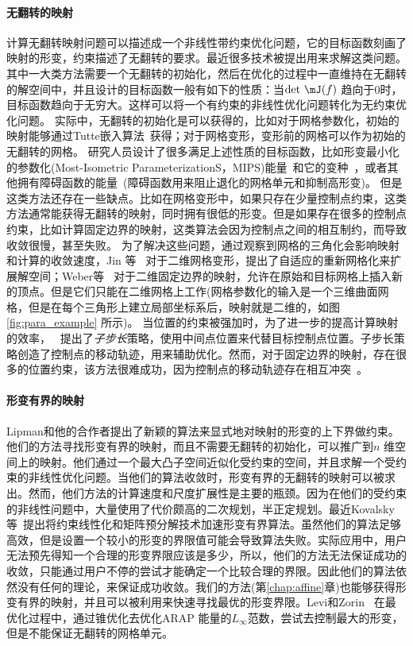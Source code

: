 \paragraph{无翻转的映射} 计算无翻转映射问题可以描述成一个非线性带约束优化问题，它的目标函数刻画了映射的形变，约束描述了无翻转的要求。最近很多技术被提出用来求解这类问题。其中一大类方法需要一个无翻转的初始化，然后在优化的过程中一直维持在无翻转的解空间中，并且设计的目标函数一般有如下的性质：当$\det\, \mJ(f)$ 趋向于0时，目标函数趋向于无穷大。这样可以将一个有约束的非线性优化问题转化为无约束优化问题。
实际中，无翻转的初始化是可以获得的，比如对于网格参数化，初始的映射能够通过Tutte嵌入算法~\cite{Tutte1963,Floater2003}获得；对于网格变形，变形前的网格可以作为初始的无翻转的网格。
研究人员设计了很多满足上述性质的目标函数，比如形变最小化的参数化(Most-Isometric ParameterizationS，MIPS)能量~\cite{Hormann2000}和它的变种~\cite{Degener2003,Fu2015,Smith2015}，或者其他拥有障碍函数的能量~\cite{Schuller2013,Jin2014}(障碍函数用来阻止退化的网格单元和抑制高形变)。
但是这类方法还存在一些缺点。比如在网格变形中，如果只存在少量控制点约束，这类方法通常能获得无翻转的映射，同时拥有很低的形变。但是如果存在很多的控制点约束，比如计算固定边界的映射，这类算法会因为控制点之间的相互制约，而导致收敛很慢，甚至失败。 为了解决这些问题，通过观察到网格的三角化会影响映射和计算的收敛速度，Jin 等~\cite{Jin2014} 对于二维网格变形，提出了自适应的重新网格化来扩展解空间；Weber等~\cite{Weber2014} 对于二维固定边界的映射，允许在原始和目标网格上插入新的顶点。但是它们只能在二维网格上工作(网格参数化的输入是一个三维曲面网格，但是在每个三角形上建立局部坐标系后，映射就是二维的，如图\ref{fig:para_example} 所示)。 当位置的约束被强加时，为了进一步的提高计算映射的效率，~\cite{Schuller2013} 提出了\emph{子步长}策略，使用中间点位置来代替目标控制点位置。子步长策略创造了控制点的移动轨迹，用来辅助优化。然而，对于固定边界的映射，存在很多的位置约束，该方法很难成功，因为控制点的移动轨迹存在相互冲突~\cite{Jin2014,Fu2015}。

\paragraph{形变有界的映射} Lipman和他的合作者提出了新颖的算法来显式地对映射的形变的上下界做约束。 他们的方法\cite{Lipman2012,Aigerman2013,Kovalsky2014,Poranne2014,Chen2015}寻找形变有界的映射，而且不需要无翻转的初始化，可以推广到$n$ 维空间上的映射。他们通过一个最大凸子空间近似化受约束的空间，并且求解一个受约束的非线性优化问题。当他们的算法收敛时，形变有界的无翻转的映射可以被求出。然而，他们方法的计算速度和尺度扩展性是主要的瓶颈。因为在他们的受约束的非线性问题中，大量使用了代价颇高的二次规划，半正定规划。最近Kovalsky等~\cite{Kovalsky2015}提出将约束线性化和矩阵预分解技术加速形变有界算法。虽然他们的算法足够高效，但是设置一个较小的形变的界限值可能会导致算法失败。实际应用中，用户无法预先得知一个合理的形变界限应该是多少，所以，他们的方法无法保证成功的收敛，只能通过用户不停的尝试才能确定一个比较合理的界限。因此他们的算法依然没有任何的理论，来保证成功收敛。我们的方法(第\ref{chap:affine}章)也能够获得形变有界的映射，并且可以被利用来快速寻找最优的形变界限。Levi和Zorin~\cite{Levi2014} 在最优化过程中，通过锥优化去优化ARAP 能量的$L_\infty$范数，尝试去控制最大的形变，但是不能保证无翻转的网格单元。

